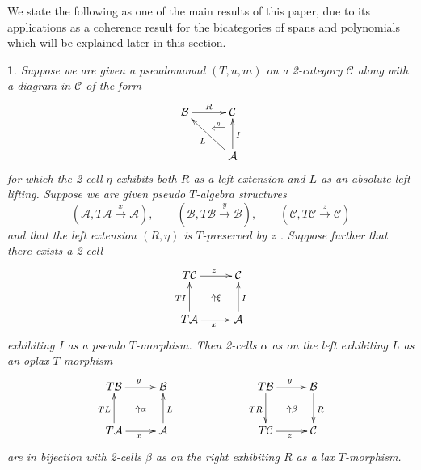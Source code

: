\documentclass[a4paper,oneside,english]{amsart}
\numberwithin{equation}{section}
\numberwithin{figure}{section}
\theoremstyle{plain}
\newtheorem{thm}{\protect\theoremname}
\theoremstyle{definition}
\theoremstyle{remark}
\theoremstyle{definition}
\theoremstyle{plain}
\theoremstyle{plain}
\theoremstyle{plain}
\providecommand{\theoremname}{Theorem}
\begin{document}
We state the following as one of the main results of this paper, due
to its applications as a coherence result for the bicategories of
spans and polynomials which will be explained later in this section.
\begin{thm}
Suppose we are given a pseudomonad $\left(T,u,m\right)$ on a 2-category
$\mathscr{C}$ along with a diagram in $\mathscr{C}$ of the form
\[
\xymatrix@=1em{\mathcal{B}\ar[rr]^{R} &  & \mathcal{C}\ar@{}[ld]|-{\stackrel{\eta}{\Longleftarrow}}\\
 & \;\\
 &  & \mathcal{A}\ar[uu]_{I}\ar[uull]^{L}
}
\]
for which the 2-cell $\eta$ exhibits both $R$ as a left extension
and $L$ as an absolute left lifting. Suppose we are given pseudo
$T$-algebra structures
\[
\left(\mathcal{A},T\mathcal{A}\stackrel{x}{\longrightarrow}\mathcal{A}\right),\qquad\left(\mathcal{B},T\mathcal{B}\stackrel{y}{\longrightarrow}\mathcal{B}\right),\qquad\left(\mathcal{C},T\mathcal{C}\stackrel{z}{\longrightarrow}\mathcal{C}\right)
\]
and that the left extension $\left(R,\eta\right)$ is $T$-preserved
by $z$ . Suppose further that there exists a 2-cell 
\[
\xymatrix@=1em{T\mathcal{C}\ar[rr]^{z} &  & \mathcal{C}\\
 & \ar@{}[]|-{\Uparrow\xi}\\
T\mathcal{A}\ar[rr]_{x}\ar[uu]^{TI} &  & \mathcal{A}\ar[uu]_{I}
}
\]
exhibiting $I$ as a pseudo $T$-morphism. Then 2-cells $\alpha$
as on the left exhibiting $L$ as an oplax $T$-morphism
\[
\xymatrix@=1em{T\mathcal{B}\ar[rr]^{y} &  & \mathcal{B} &  &  &  &  & T\mathcal{B}\ar[rr]^{y}\ar[dd]_{TR} &  & \mathcal{B}\ar[dd]^{R}\\
 & \ar@{}[]|-{\Uparrow\alpha} &  &  &  &  &  &  & \ar@{}[]|-{\Uparrow\beta}\\
T\mathcal{A}\ar[rr]_{x}\ar[uu]^{TL} &  & \mathcal{A}\ar[uu]_{L} &  &  &  &  & T\mathcal{C}\ar[rr]_{z} &  & \mathcal{C}
}
\]
are in bijection with 2-cells $\beta$ as on the right exhibiting
$R$ as a lax $T$-morphism.\end{thm}
\end{document}
